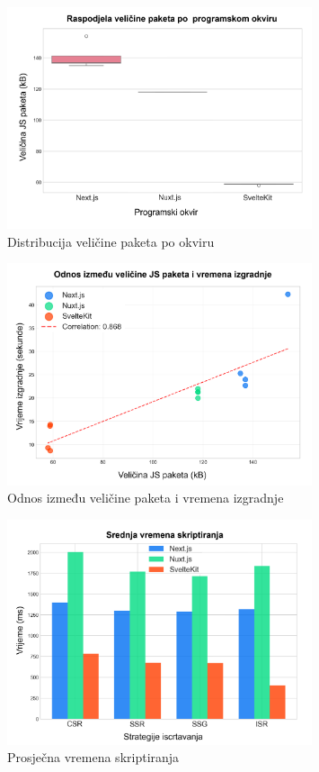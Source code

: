 \begin{figure}[H]
    \centering
    \includegraphics[width=0.8\textwidth]{slike/rezultati/dodatne-metrike/bundle_size_distribution_by_framework.png}
    \caption{Distribucija veličine paketa po okviru}
    \label{fig:bundle_size_distribution_by_framework}
\end{figure}

\begin{figure}[H]
    \centering
    \includegraphics[width=0.8\textwidth]{slike/rezultati/dodatne-metrike/bundle_size_vs_build_time_correlation.png}
    \caption{Odnos između veličine paketa i vremena izgradnje}
    \label{fig:bundle_size_vs_build_time_correlation}
\end{figure}

\begin{figure}[H]
    \centering
    \includegraphics[width=0.8\textwidth]{slike/rezultati/dodatne-metrike/average_scripting_performance_times.png}
    \caption{Prosječna vremena skriptiranja}
    \label{fig:average_scripting_performance_times}
\end{figure}

